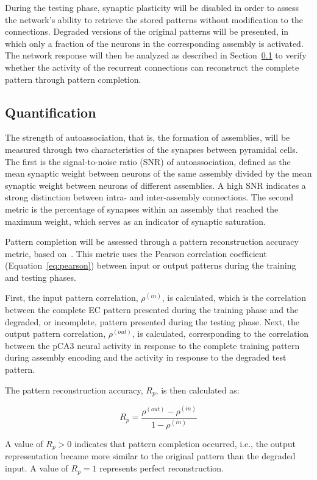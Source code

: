 During the testing phase, synaptic plasticity will be disabled in order to assess the network's ability to retrieve the stored
patterns without modification to the connections. Degraded versions of the original patterns will be presented, in which only a
fraction of the neurons in the corresponding assembly is activated. The network response will then be analyzed as described in
Section~\ref{sec:quantificacao} to verify whether the activity of the recurrent connections can reconstruct the complete
pattern through pattern completion.

\subsection{Quantification}\label{sec:quantificacao}

The strength of autoassociation, that is, the formation of assemblies, will be measured through two characteristics of the
synapses between pyramidal cells. The first is the signal-to-noise ratio (SNR) of autoassociation, defined as the mean synaptic
weight between neurons of the same assembly divided by the mean synaptic weight between neurons of different assemblies. A high
SNR indicates a strong distinction between intra- and inter-assembly connections. The second metric is the percentage of
synapses within an assembly that reached the maximum weight, which serves as an indicator of synaptic saturation.

Pattern completion will be assessed through a pattern reconstruction accuracy metric, based
on~\parencite{kopsickFormation2024}. This metric uses the Pearson correlation coefficient (Equation~\ref{eq:pearson}) between input
or output patterns during the training and testing phases.

First, the input pattern correlation, $\rho^{(in)}$, is calculated, which is the correlation between the complete EC pattern
presented during the training phase and the degraded, or incomplete, pattern presented during the testing phase. Next, the
output pattern correlation, $\rho^{(out)}$, is calculated, corresponding to the correlation between the pCA3 neural activity
in response to the complete training pattern during assembly encoding and the activity in response to the degraded test pattern.

The pattern reconstruction accuracy, $R_p$, is then calculated as:

\begin{equation}
    \label{eq:rp}
    R_p = \frac{\rho^{(out)} - \rho^{(in)}}{1 - \rho^{(in)}}
\end{equation}

A value of $R_p > 0$ indicates that pattern completion occurred, i.e., the output representation became more similar to the
original pattern than the degraded input. A value of $R_p = 1$ represents perfect reconstruction.
